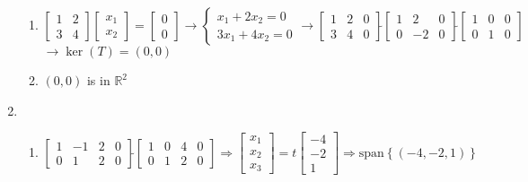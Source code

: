 \documentclass[12pt]{article}
\begin{document}
\begin{enumerate}
\begin{enumerate}
      \item $\begin{bmatrix} 1 & 2\\ 3 & 4\end{bmatrix}\begin{bmatrix} x_1\\x_2\end{bmatrix}=\begin{bmatrix} 0\\ 0\end{bmatrix}\rightarrow \left\{ \begin{array}{c} x_1+2x_2=0\\ 3x_1+4x_2=0\end{array}\rightarrow \left[ \begin{array}{cc|c} 1 & 2 & 0\\ 3 & 4 & 0 \end{array}\right]\widetilde{ }\left[ \begin{array}{cc|c} 1 & 2 & 0\\ 0 & -2 & 0  \end{array} \right]\widetilde{ }\left[ \begin{array}{cc|c} 1 & 0 & 0\\ 0 & 1 & 0\end{array} \right]$\\$\rightarrow \ker(T)=(0,0)$

      \item $(0,0)$ is in $\mathbb{R}^2$

    \end{enumerate}

    \setcounter{enumi}{12}

  \item

    \begin{enumerate}

      \item $\left[ \begin{array}{ccc|c} 1 & -1 & 2 & 0\\ 0 & 1 & 2 & 0 \end{array}\right]\widetilde{ }\left[ \begin{array}{ccc|c} 1 & 0 & 4 & 0\\ 0 & 1 & 2 & 0\end{array} \right]\Rightarrow\begin{bmatrix} x_1\\x_2\\x_3\end{bmatrix} =t\begin{bmatrix} -4\\-2\\1\end{bmatrix}\Rightarrow \text{span}\left\{ (-4,-2,1) \right\}$


\end{enumerate}
\end{enumerate}
\end{document}
